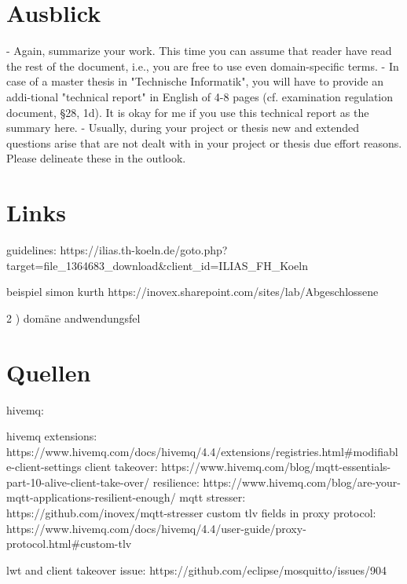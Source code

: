 \section{Ausblick}

- Again, summarize your work. This time you can assume that reader have read the rest of the document, i.e., you are free to use even domain-specific terms.
- In case of a master thesis in "Technische Informatik", you will have to provide an addi-tional "technical report" in English of 4-8 pages (cf. examination regulation document, §28, 1d). It is okay for me if you use this technical report as the summary here.
- Usually, during your project or thesis new and extended questions arise that are not dealt with in your project or thesis due effort reasons. Please delineate these in the outlook.




\section{Links}
guidelines: https://ilias.th-koeln.de/goto.php?target=file_1364683_download&client_id=ILIAS_FH_Koeln

beispiel simon kurth
https://inovex.sharepoint.com/sites/lab/Abgeschlossene%


2 ) domäne andwendungsfel

\section{Quellen}
hivemq:

hivemq extensions: https://www.hivemq.com/docs/hivemq/4.4/extensions/registries.html#modifiable-client-settings
client takeover: https://www.hivemq.com/blog/mqtt-essentials-part-10-alive-client-take-over/
resilience: https://www.hivemq.com/blog/are-your-mqtt-applications-resilient-enough/
mqtt stresser: https://github.com/inovex/mqtt-stresser
custom tlv fields in proxy protocol: https://www.hivemq.com/docs/hivemq/4.4/user-guide/proxy-protocol.html#custom-tlv

lwt and client takeover issue: https://github.com/eclipse/mosquitto/issues/904

